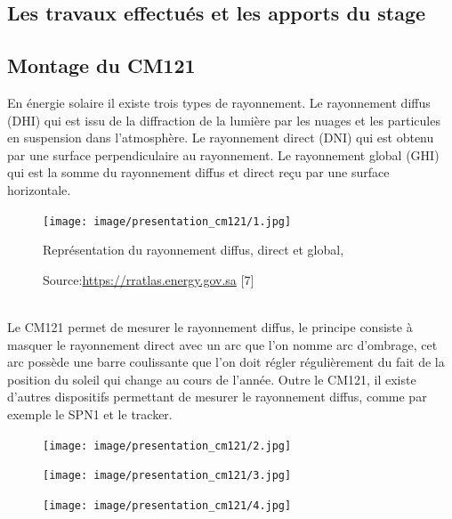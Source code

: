 \documentclass[12pt,a4paper]{article}
\begin{document}
\begin{flushleft}
\section{Les travaux effectués et les apports du stage}


\subsection{Montage du CM121}

En énergie solaire il existe trois types de rayonnement. Le rayonnement diffus (DHI) qui est issu de la diffraction de la lumière par les nuages et les particules en suspension dans l'atmosphère. Le rayonnement direct (DNI) qui est obtenu par une surface perpendiculaire au rayonnement. Le rayonnement global (GHI) qui est la somme du rayonnement diffus et direct reçu  par une surface horizontale.\\

\begin{figure}[H]
\centering
\texttt{[image: image/presentation\_cm121/1.jpg]} 
\caption{Représentation du rayonnement diffus, direct et global, }
\caption*{Source:\href{https://rratlas.energy.gov.sa/RRMMPublicPortal/sites/default/files/How\%20to\%20Read\%20Live\%20Graph.htm}{https://rratlas.energy.gov.sa} [7]}
\end{figure}
~\\
Le CM121 permet de mesurer le rayonnement diffus, le principe consiste à masquer le rayonnement direct avec un arc que l'on nomme arc d'ombrage, cet arc possède une barre coulissante que l'on doit régler régulièrement du fait de la position du soleil qui change au cours de l'année. Outre le CM121, il existe d'autres dispositifs permettant de mesurer le rayonnement diffus, comme par exemple le SPN1 et le tracker.

\begin{figure}[H]
    \begin{minipage}[c]{.2\linewidth}
        \centering
        \texttt{[image: image/presentation\_cm121/2.jpg]}  
        
    \end{minipage}
    \hfill%
    \begin{minipage}[c]{.2\linewidth}
        \centering
        \texttt{[image: image/presentation\_cm121/3.jpg]}  
        
    \end{minipage}
    \hfill%
    \begin{minipage}[c]{.3\linewidth}
        \centering
        \texttt{[image: image/presentation\_cm121/4.jpg]} 
        

\end{minipage}
\end{figure}
\end{flushleft}
\end{document}
